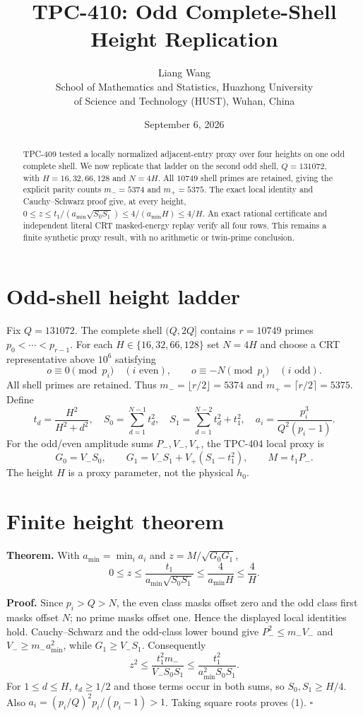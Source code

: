 \documentclass[11pt]{article}
\title{TPC-410: Odd Complete-Shell Height Replication}
\author{Liang Wang\\School of Mathematics and Statistics, Huazhong University\\of Science and Technology (HUST), Wuhan, China}
\date{September 6, 2026}
\begin{document}
\maketitle

\begin{abstract}
TPC-409 tested a locally normalized adjacent-entry proxy over four heights
on one odd complete shell.  We now replicate that ladder on the second odd
shell, $Q=131072$, with $H=16,32,66,128$ and $N=4H$.  All $10749$ shell
primes are retained, giving the explicit parity counts $m_-=5374$ and
$m_+=5375$.  The exact local identity and
Cauchy--Schwarz proof give, at every height,
$0\le z\le t_1/(a_{\min}\sqrt{S_0S_1})\le4/(a_{\min}H)\le4/H$.
An exact rational certificate and independent literal CRT masked-energy
replay verify all four rows.  This remains a finite synthetic proxy result,
with no arithmetic or twin-prime conclusion.
\end{abstract}

\section{Odd-shell height ladder}
Fix $Q=131072$.  The complete shell $(Q,2Q]$ contains $r=10749$ primes
$p_0<\cdots<p_{r-1}$.  For each $H\in\{16,32,66,128\}$ set $N=4H$ and
choose a CRT representative above $10^6$ satisfying
\[
 o\equiv0\pmod {p_i}\quad(i\text{ even}),\qquad
 o\equiv-N\pmod {p_i}\quad(i\text{ odd}).
\]
All shell primes are retained.  Thus $m_-=\lfloor r/2\rfloor=5374$ and
$m_+=\lceil r/2\rceil=5375$.  Define
\[
 t_d=\frac{H^2}{H^2+d^2},\quad S_0=\sum_{d=1}^{N-1}t_d^2,
 \quad S_1=\sum_{d=1}^{N-2}t_d^2+t_1^2,
 \quad a_i=\frac{p_i^3}{Q^2(p_i-1)}.
\]
For the odd/even amplitude sums $P_-,V_-,V_+$, the TPC-404 local proxy is
\[
G_0=V_-S_0,\qquad G_1=V_-S_1+V_+(S_1-t_1^2),\qquad M=t_1P_-.
\]
The height $H$ is a proxy parameter, not the physical $h_0$.

\section{Finite height theorem}
\textbf{Theorem.} With $a_{\min}=\min_i a_i$ and
$z=M/\sqrt{G_0G_1}$,
\[
0\le z\le\frac{t_1}{a_{\min}\sqrt{S_0S_1}}
 \le\frac4{a_{\min}H}\le\frac4H. \tag{1}
\]

\textbf{Proof.} Since $p_i>Q>N$, the even class masks offset zero and the
odd class first masks offset $N$; no prime masks offset one.  Hence the
displayed local identities hold.  Cauchy--Schwarz and the odd-class lower
bound give $P_-^2\le m_-V_-$ and $V_-\ge m_-a_{\min}^2$, while
$G_1\ge V_-S_1$.  Consequently
\[
z^2\le\frac{t_1^2m_-}{V_-S_0S_1}
\le\frac{t_1^2}{a_{\min}^2S_0S_1}.
\]
For $1\le d\le H$, $t_d\ge1/2$ and those terms occur in both sums, so
$S_0,S_1\ge H/4$.  Also
$a_i=(p_i/Q)^2p_i/(p_i-1)>1$.  Taking square roots proves (1). \hfill$\square$
\end{document}
